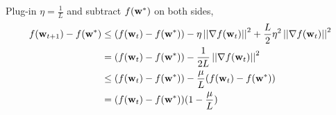 \documentclass[12pt]{article}
\newcommand{\sqnorm}[1]{\left|\left|#1\right|\right|^2}
\newcommand{\w}{{\bf w}}
\newcommand{\wstar}{{\bf w^*}}
\begin{document}
{Plug-in $\eta=\frac1L$ and subtract $f(\wstar)$ on both sides,
\begin{align}
f(\w_{t+1}) - f(\wstar)
&\leq (f(\w_{t}) - f(\wstar)) - \eta \sqnorm{\nabla f(\w_t)} + \frac{L}{2} \eta^2 \sqnorm{\nabla f(\w_t)} \nonumber \\
&= (f(\w_{t}) - f(\wstar)) - \frac{1}{2L} \sqnorm{\nabla f(\w_t)} \nonumber \\
&\leq (f(\w_{t}) - f(\wstar)) - \frac{\mu}{L} (f(\w_{t}) - f(\wstar)) \nonumber \\
&= (f(\w_{t}) - f(\wstar)) (1 - \frac{\mu}{L})
\label{eq:basic_eq}
\end{align}
}
\end{document}
